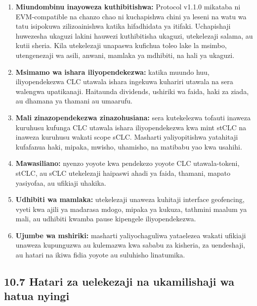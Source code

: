 \documentclass[11pt]{article}
\begin{document}
\begin{enumerate}[leftmargin=*]
\item \textbf{Miundombinu inayoweza kuthibitishwa:} Protocol v1.1.0 mikataba ni EVM-compatible na chanzo chao ni kuchapishwa chini ya leseni na watu wa tatu isipokuwa zilizoainishwa katika hifadhidata ya itifaki. Uchapishaji huwezesha ukaguzi lakini hauwezi kuthibitisha ukaguzi, utekelezaji salama, au kutii sheria. Kila utekelezaji unapaswa kufichua toleo lake la msimbo, utengenezaji wa asili, anwani, mamlaka ya mdhibiti, na hali ya ukaguzi.
\item \textbf{Msimamo wa ishara iliyopendekezwa:} katika muundo huu, iliyopendekezwa CLC utawala ishara ingekuwa kuhariri utawala na sera walengwa upatikanaji. Haitaunda dividends, ushiriki wa faida, haki za ziada, au dhamana ya thamani au umaarufu.
\item \textbf{Mali zinazopendekezwa zinazohusiana:} sera kutekelezwa tofauti inaweza kuruhusu kufunga CLC utawala ishara iliyopendekezwa kwa mint stCLC na inaweza kuruhusu wakati scope sCLC. Masharti yaliyopitishwa yatahitaji kufafanua haki, mipaka, mwisho, uhamisho, na matibabu yao kwa usahihi.
\item \textbf{Mawasiliano:} nyenzo yoyote kwa pendekezo yoyote CLC utawala-tokeni, stCLC, au sCLC utekelezaji haipaswi ahadi ya faida, thamani, mapato yasiyofaa, au ufikiaji uhakika.
\item \textbf{Udhibiti wa mamlaka:} utekelezaji unaweza kuhitaji interface geofencing, vyeti kwa ajili ya madarasa mdogo, mipaka ya kukuza, tathmini maalum ya mali, au udhibiti kwamba pause kipengele iliyopendekezwa.
\item \textbf{Ujumbe wa mshiriki:} masharti yaliyochaguliwa yataelezea wakati ufikiaji unaweza kupunguzwa au kulemazwa kwa sababu za kisheria, za uendeshaji, au hatari na ikiwa fidia yoyote au suluhisho linatumika.
\end{enumerate}
\subsection*{10.7 Hatari za uelekezaji na ukamilishaji wa hatua nyingi}
\end{document}
